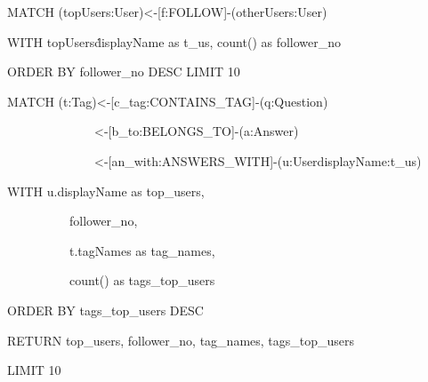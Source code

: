 \textcolor{mygreen}{MATCH} (topUsers:User)<-[f:FOLLOW]-(otherUsers:User)\par
\textcolor{mygreen}{WITH} topUsers\.displayName \textcolor{mygreen}{as} t\_us, count(\*) \textcolor{mygreen}{as} follower\_no\par
\textcolor{mygreen}{ORDER BY} follower\_no
\textcolor{mygreen}{DESC LIMIT} 10 \par
\textcolor{mygreen}{MATCH} (t:Tag)<-[c\_tag:CONTAINS\_TAG]-(q:Question)\par
~~~~~~~~~~~~~~<-[b\_to:BELONGS\_TO]-(a:Answer)\par
~~~~~~~~~~~~~~<-[an\_with:ANSWERS\_WITH]-(u:User{displayName:t\_us})\par
\textcolor{mygreen}{WITH} u.displayName \textcolor{mygreen}{as} top\_users,\par
~~~~~~~~~~follower\_no,\par
~~~~~~~~~~t.tagNames \textcolor{mygreen}{as} tag\_names,\par
~~~~~~~~~~count(\*) \textcolor{mygreen}{as} tags\_top\_users \par
\textcolor{mygreen}{ORDER BY} tags\_top\_users  \textcolor{mygreen}{DESC} \par
\textcolor{mygreen}{RETURN} top\_users, follower\_no, tag\_names, tags\_top\_users \par
\textcolor{mygreen}{LIMIT} 10